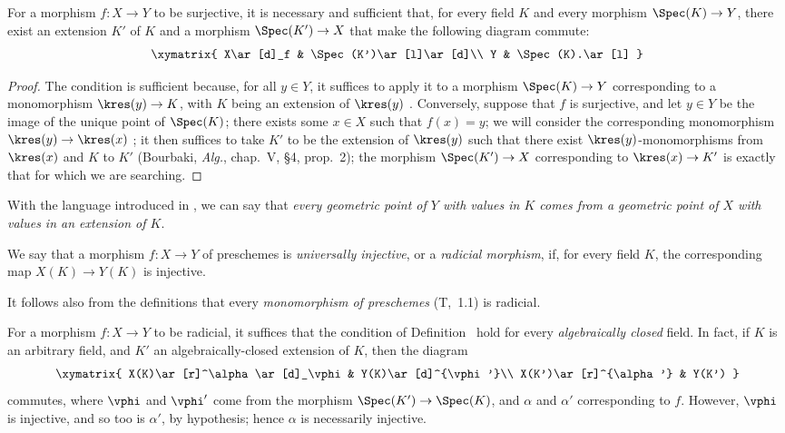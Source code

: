 \begin{proposition}[3.5.3]
\label{I.3.5.3}
For a morphism $f:X\to Y$ to be surjective, it is necessary and sufficient that, for every field $K$ and every morphism $\Spec(K)\to Y$, there exist an extension $K'$ of $K$ and a morphism $\Spec(K')\to X$ that make the following diagram commute:
\[
  \xymatrix{
    X\ar[d]_f &
    \Spec(K')\ar[l]\ar[d]\\
    Y &
    \Spec(K).\ar[l]
  }
\]
\end{proposition}

\begin{proof}
The condition is sufficient because, for all $y\in Y$, it suffices to apply it to a morphism $\Spec(K)\to Y$ corresponding to a monomorphism $\kres(y)\to K$, with $K$ being an extension of $\kres(y)$ .
Conversely, suppose that $f$ is surjective, and let $y\in Y$ be the image of the unique point of $\Spec(K)$; there exists some $x\in X$ such that $f(x)=y$; we will consider the corresponding monomorphism $\kres(y)\to\kres(x)$ ; it then suffices to take $K'$ to be the extension of $\kres(y)$ such that there exist $\kres(y)$-monomorphisms from $\kres(x)$ and $K$ to $K'$ (Bourbaki, \emph{Alg.}, chap.~V, §4, prop.~2); the morphism $\Spec(K')\to X$ corresponding to $\kres(x)\to K'$ is exactly that for which we are searching.
\end{proof}

With the language introduced in , we can say that \emph{every geometric point of $Y$ with values in $K$ comes from a geometric point of $X$ with values in an extension of $K$}.

\begin{definition}[3.5.4]
\label{I.3.5.4}
We say that a morphism $f:X\to Y$ of preschemes is \emph{universally injective}, or a \emph{radicial morphism}, if, for every field $K$, the corresponding map $X(K)\to Y(K)$ is injective.
\end{definition}

It follows also from the definitions that every \emph{monomorphism of preschemes} (T,~1.1) is radicial.

\begin{env}[3.5.5]
\label{I.3.5.5}
For a morphism $f:X\to Y$ to be radicial, it suffices that the condition of Definition~ hold for every \emph{algebraically closed} field.
In fact, if $K$ is an arbitrary field, and $K'$ an algebraically-closed extension of $K$, then the diagram
\[
  \xymatrix{
    X(K)\ar[r]^\alpha\ar[d]_\vphi &
    Y(K)\ar[d]^{\vphi'}\\
    X(K')\ar[r]^{\alpha'} &
    Y(K')
  }
\]
commutes, where $\vphi$ and $\vphi'$ come from the morphism $\Spec(K')\to\Spec(K)$, and $\alpha$ and $\alpha'$ corresponding to $f$.
However, $\vphi$ is injective, and so too is $\alpha'$, by hypothesis; hence $\alpha$ is necessarily injective.
\end{env}

